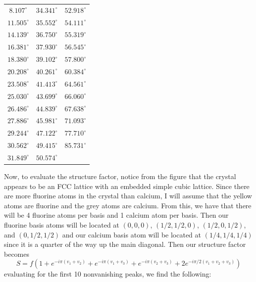\documentclass{article}
\begin{document}
\begin{center}
    \begin{tabular}{c|c|c}
        $8.107^{\circ}$ & $34.341^{\circ}$ & $52.918^{\circ}$ \\
        $11.505^{\circ}$ & $35.552^{\circ}$ & $54.111^{\circ}$ \\
        $14.139^{\circ}$ & $36.750^{\circ}$ & $55.319^{\circ}$ \\
        $16.381^{\circ}$ & $37.930^{\circ}$ & $56.545^{\circ}$ \\
        $18.380^{\circ}$ & $39.102^{\circ}$ & $57.800^{\circ}$ \\
        $20.208^{\circ}$ & $40.261^{\circ}$ & $60.384^{\circ}$ \\
        $23.508^{\circ}$ & $41.413^{\circ}$ & $64.561^{\circ}$ \\
        $25.030^{\circ}$ & $43.699^{\circ}$ & $66.060^{\circ}$ \\
        $26.486^{\circ}$ & $44.839^{\circ}$ & $67.638^{\circ}$ \\
        $27.886^{\circ}$ & $45.981^{\circ}$ & $71.093^{\circ}$ \\
        $29.244^{\circ}$ & $47.122^{\circ}$ & $77.710^{\circ}$ \\
        $30.562^{\circ}$ & $49.415^{\circ}$ & $85.731^{\circ}$ \\
        $31.849^{\circ}$ & $50.574^{\circ}$ &  \\
    \end{tabular}
\end{center}
Now, to evaluate the structure factor, notice from the figure that the crystal appears to be an FCC lattice with an embedded simple cubic lattice. Since there are more fluorine atoms in the crystal than calcium, I will assume that the yellow atoms are fluorine and the grey atoms are calcium. From this, we have that there will be 4 fluorine atoms per basis and 1 calcium atom per basis. Then our fluorine basis atoms will be located at $(0,0,0)$, $(1/2,1/2,0)$, $(1/2,0,1/2)$, and $(0,1/2,1/2)$ and our calcium basis atom will be located at $(1/4,1/4,1/4)$ since it is a quarter of the way up the main diagonal. Then our structure factor becomes
\[S = f\left(1 + e^{-i\pi(v_1 + v_2)} + e^{-i\pi(v_1 +v_3)} + e^{-i\pi(v_2 + v_3)} + 2e^{-i\pi/2(v_1 + v_2 + v_3)}\right)\]
evaluating for the first 10 nonvanishing peaks, we find the following:
\end{document}
